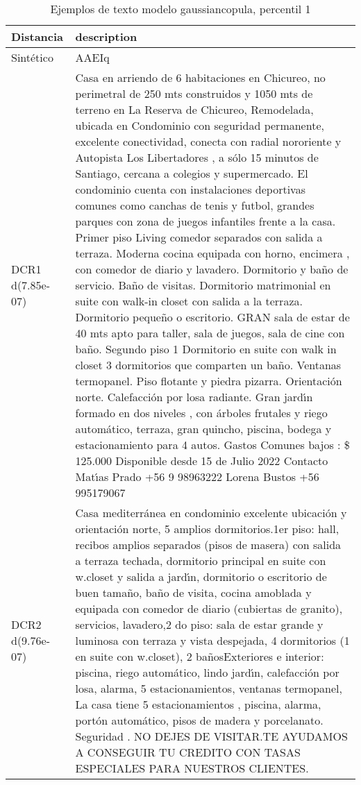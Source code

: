 \begin{table}[H]
\centering
\fontsize{10}{14}\selectfont
\caption{Ejemplos de texto modelo gaussiancopula, percentil 1}
\label{table-example-economicos-a-3-gaussiancopula-1p-text}
\begin{tabular}{|l|m{35em}|}
\hline
\rowcolor[gray]{0.8}
Distancia & description \\
\hline Sintético & AAEIq \\
\hline DCR1 d(7.85e-07) & Casa en arriendo de 6 habitaciones en Chicureo, no perimetral de 250 mts construidos y 1050 mts de terreno en La Reserva de Chicureo, Remodelada, ubicada en Condominio con seguridad permanente, excelente conectividad, conecta con radial nororiente y Autopista Los Libertadores , a s\'olo 15 minutos de Santiago, cercana a colegios y supermercado. El condominio cuenta con instalaciones deportivas comunes como canchas de tenis y futbol, grandes parques con zona de juegos infantiles frente a la casa.
  Primer piso Living comedor separados con salida a terraza. Moderna cocina equipada con horno, encimera , con comedor de diario y lavadero. Dormitorio y ba\~no de servicio. Ba\~no de visitas. Dormitorio matrimonial en suite con walk-in closet con salida a la terraza. Dormitorio peque\~no o escritorio. GRAN sala de estar de 40 mts apto para taller, sala de juegos, sala de cine con ba\~no.  Segundo piso 1 Dormitorio en suite con walk  in closet 3 dormitorios que comparten un ba\~no.  Ventanas termopanel. Piso flotante y piedra pizarra. Orientaci\'on norte. Calefacci\'on por losa radiante. Gran jard{\'\i}n formado en dos niveles , con \'arboles frutales y riego autom\'atico, terraza, gran quincho, piscina, bodega y estacionamiento para 4 autos. Gastos Comunes bajos : \$ 125.000 Disponible desde 15 de Julio 2022 Contacto  Mat{\'\i}as Prado +56 9 98963222 Lorena Bustos +56 995179067 \\
\hline DCR2 d(9.76e-07) & Casa mediterr\'anea en condominio excelente ubicaci\'on y orientaci\'on norte, 5 amplios dormitorios.1er piso: hall, recibos amplios separados (pisos de masera) con salida a terraza techada, dormitorio principal en suite con w.closet y salida a jard{\'\i}n, dormitorio o escritorio de buen tama\~no, ba\~no de visita, cocina amoblada y equipada con comedor de diario (cubiertas de granito), servicios, lavadero,2 do piso: sala de estar grande y luminosa con terraza y vista despejada, 4 dormitorios (1 en suite con w.closet), 2 ba\~nosExteriores e interior: piscina, riego autom\'atico, lindo jard{\'\i}n, calefacci\'on por losa, alarma, 5 estacionamientos, ventanas termopanel, La casa tiene 5 estacionamientos , piscina, alarma, port\'on autom\'atico, pisos de madera y porcelanato. Seguridad . NO DEJES DE VISITAR.TE AYUDAMOS A CONSEGUIR TU CREDITO CON TASAS ESPECIALES PARA NUESTROS CLIENTES. \\
\hline
\end{tabular}
\end{table}
